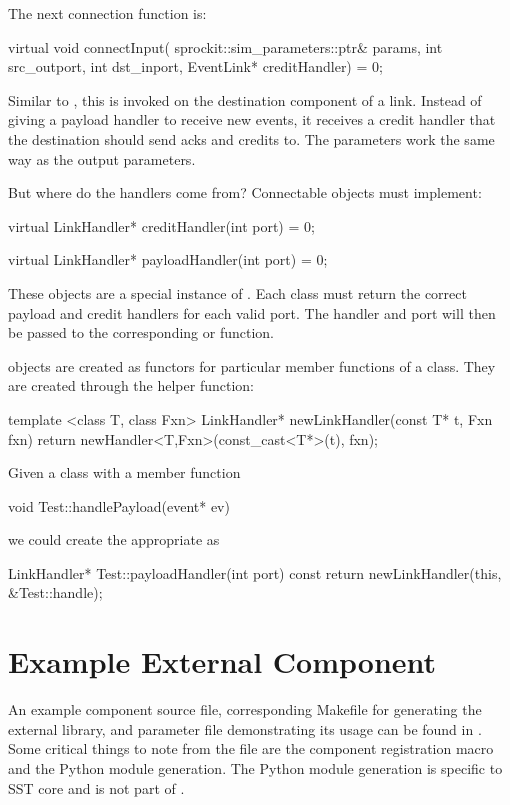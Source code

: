 The next connection function is:
\begin{CppCode}
  virtual void connectInput(
    sprockit::sim_parameters::ptr& params,
    int src_outport,
    int dst_inport,
    EventLink* creditHandler) = 0;
\end{CppCode}
Similar to , this is invoked on the destination component of a link.
Instead of giving a payload handler to receive new events,
it receives a credit handler that the destination should send acks and credits to.
The parameters work the same way as the output parameters.

But where do the handlers come from? Connectable objects must implement:

\begin{CppCode}
virtual LinkHandler* creditHandler(int port) = 0;

virtual LinkHandler* payloadHandler(int port) = 0;
\end{CppCode}

These  objects are a special instance of .
Each class must return the correct payload and credit handlers for each valid port.
The handler and port will then be passed to the corresponding  or  function.

 objects are created as functors for particular member functions of a class.
They are created through the helper function:

\begin{CppCode}
template <class T, class Fxn>
LinkHandler* newLinkHandler(const T* t, Fxn fxn){
  return newHandler<T,Fxn>(const_cast<T*>(t), fxn);
}
\end{CppCode}
Given a class  with a member function

\begin{CppCode}
void Test::handlePayload(event* ev)
\end{CppCode}
we could create the appropriate  as

\begin{CppCode}
LinkHandler* Test::payloadHandler(int port) const {
  return newLinkHandler(this, &Test::handle);
}
\end{CppCode}

\section{Example External Component}
An example component source file, corresponding Makefile for generating the external library, and parameter file demonstrating its usage can be found in .
Some critical things to note from the file  are the component registration macro and the Python module generation.
The Python module generation is specific to SST core and is not part of \sstmacro.

